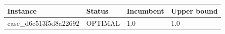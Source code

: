 \begin{tabular}{llll}
\toprule
Instance & Status & Incumbent & Upper bound\\
\midrule
case\_d6c513f5d8a22692 & OPTIMAL & 1.0 & 1.0\\
\bottomrule
\end{tabular}